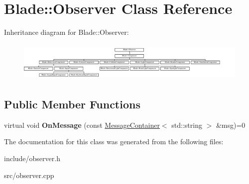 \hypertarget{class_blade_1_1_observer}{}\section{Blade\+:\+:Observer Class Reference}
\label{class_blade_1_1_observer}
Inheritance diagram for Blade\+:\+:Observer\+:\begin{figure}[H]
\begin{center}
\leavevmode
\includegraphics[height=1.913875cm]{class_blade_1_1_observer}
\end{center}
\end{figure}
\subsection*{Public Member Functions}
\begin{DoxyCompactItemize}
\item 
\mbox{\label{class_blade_1_1_observer_acbb85f46b9cd5c60e4c7b8ebb7dc4faa}} 
virtual void {\bfseries On\+Message} (const \hyperlink{class_blade_1_1_ref_counted_container}{Message\+Container}$<$ std\+::string $>$ \&msg)=0
\end{DoxyCompactItemize}


The documentation for this class was generated from the following files\+:\begin{DoxyCompactItemize}
\item 
include/observer.\+h\item 
src/observer.\+cpp\end{DoxyCompactItemize}
